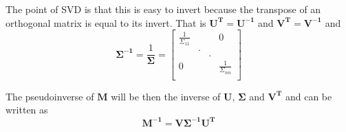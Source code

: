 The point of SVD is that this is easy to invert because the transpose of an orthogonal matrix is equal to its invert. That is   $\bm{U^T}=\bm{U^{-1}}$ and $\bm{V^T}=\bm{V^{-1}}$ and
\begin{equation}\label{eq:sigma_inv}
\bm{\Sigma^{-1}=}\frac{1}{\bm{\Sigma}} = \begin{bmatrix} 
\frac{1}{\Sigma_{11}} &  &  & 0 \\
  & . &  &  \\
  &   & . &  \\

0 &  &  & \frac{1}{\Sigma_{nn}} \\
 \end{bmatrix}
\end{equation}

The pseudoinverse of $\bm{M}$ will be then the inverse of $\bm{U}$, $\bm{\Sigma}$ and $\bm{V^T}$ and can be written as
\begin{equation}\label{eq:psMinv}
    \bm{M^{-1}} = \bm{V \Sigma^{-1} U^T}
\end{equation}






